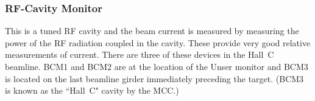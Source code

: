 \subsubsection{RF-Cavity Monitor} This is a tuned RF cavity and the beam current
is measured by measuring the power of the RF radiation coupled in the cavity.
These provide very good relative measurements of current. There are three
of these
devices in the Hall~C beamline. BCM1 and BCM2 are at the location of the Unser
monitor and BCM3 is located on the last beamline girder
immediately preceding the target.  (BCM3 is known as the ``Hall~C" cavity 
by the MCC.)


